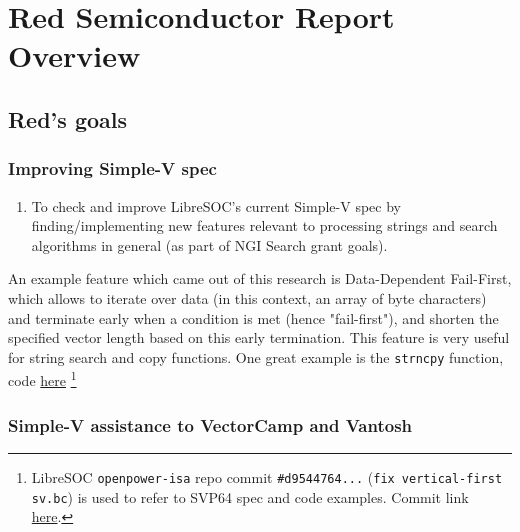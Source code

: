 \section{Red Semiconductor Report Overview}

\subsection{Red's goals}

\subsubsection{Improving Simple-V spec}

\begin{enumerate}
  \item To check and improve LibreSOC's current Simple-V spec by finding/implementing
  new features relevant to processing strings and search algorithms in general
  (as part of NGI Search grant goals).
\end{enumerate}

An example feature which came out of this research is
Data-Dependent Fail-First, which allows to iterate over data (in
this context, an array of byte characters) and terminate early when
a condition is met (hence "fail-first"), and shorten the specified
vector length based on this early termination. This feature is very useful
for string search and copy functions. One great example is the \texttt{strncpy}
function, code \href{https://git.libre-soc.org/?p=openpower-isa.git;a=blob;f=src/openpower/decoder/isa/test_caller_svp64_ldst.py;h=4ecf534777a5e8a0178b29dbcd69a1a5e2dd14d6;hb=d9544764b1710f3807a9c0685d150a665f70b9a2#l31}{here}
\footnote{LibreSOC \texttt{openpower-isa} repo commit \texttt{\#d9544764...}
(\texttt{fix vertical-first sv.bc}) is used to refer to
SVP64 spec and code examples. Commit link
\href{https://git.libre-soc.org/?p=openpower-isa.git;a=commit;h=d9544764b1710f3807a9c0685d150a665f70b9a2}{here}.}

\subsubsection{Simple-V assistance to VectorCamp and Vantosh}


